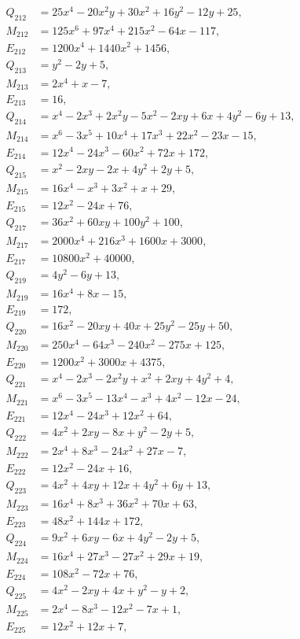 \documentclass[11pt]{article}
\begin{document}
\begin{align*}
Q_{212}&=25x^{4}-20x^{2}y+30x^{2}+16y^{2}-12y+25,\\
M_{212}&=125x^{6}+97x^{4}+215x^{2}-64x-117,\\
E_{212}&=1200x^{4}+1440x^{2}+1456,\\
Q_{213}&=y^{2}-2y+5,\\
M_{213}&=2x^{4}+x-7,\\
E_{213}&=16,\\
Q_{214}&=x^{4}-2x^{3}+2x^{2}y-5x^{2}-2xy+6x+4y^{2}-6y+13,\\
M_{214}&=x^{6}-3x^{5}+10x^{4}+17x^{3}+22x^{2}-23x-15,\\
E_{214}&=12x^{4}-24x^{3}-60x^{2}+72x+172,\\
Q_{215}&=x^{2}-2xy-2x+4y^{2}+2y+5,\\
M_{215}&=16x^{4}-x^{3}+3x^{2}+x+29,\\
E_{215}&=12x^{2}-24x+76,\\
Q_{217}&=36x^{2}+60xy+100y^{2}+100,\\
M_{217}&=2000x^{4}+216x^{3}+1600x+3000,\\
E_{217}&=10800x^{2}+40000,\\
Q_{219}&=4y^{2}-6y+13,\\
M_{219}&=16x^{4}+8x-15,\\
E_{219}&=172,\\
Q_{220}&=16x^{2}-20xy+40x+25y^{2}-25y+50,\\
M_{220}&=250x^{4}-64x^{3}-240x^{2}-275x+125,\\
E_{220}&=1200x^{2}+3000x+4375,\\
Q_{221}&=x^{4}-2x^{3}-2x^{2}y+x^{2}+2xy+4y^{2}+4,\\
M_{221}&=x^{6}-3x^{5}-13x^{4}-x^{3}+4x^{2}-12x-24,\\
E_{221}&=12x^{4}-24x^{3}+12x^{2}+64,\\
Q_{222}&=4x^{2}+2xy-8x+y^{2}-2y+5,\\
M_{222}&=2x^{4}+8x^{3}-24x^{2}+27x-7,\\
E_{222}&=12x^{2}-24x+16,\\
Q_{223}&=4x^{2}+4xy+12x+4y^{2}+6y+13,\\
M_{223}&=16x^{4}+8x^{3}+36x^{2}+70x+63,\\
E_{223}&=48x^{2}+144x+172,\\
Q_{224}&=9x^{2}+6xy-6x+4y^{2}-2y+5,\\
M_{224}&=16x^{4}+27x^{3}-27x^{2}+29x+19,\\
E_{224}&=108x^{2}-72x+76,\\
Q_{225}&=4x^{2}-2xy+4x+y^{2}-y+2,\\
M_{225}&=2x^{4}-8x^{3}-12x^{2}-7x+1,\\
E_{225}&=12x^{2}+12x+7,
\end{align*}
\end{document}
